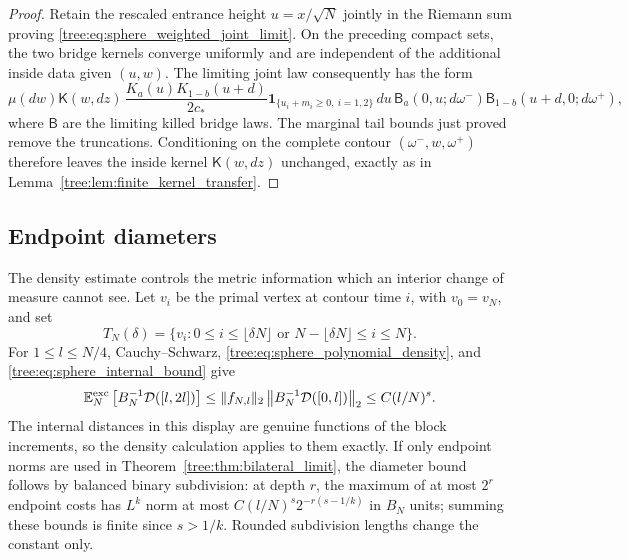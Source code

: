 \begin{proof}
Retain the rescaled entrance height $u=x/\sqrt N$ jointly in the Riemann
sum proving \eqref{tree:eq:sphere_weighted_joint_limit}.  On the preceding
compact sets, the two bridge kernels converge uniformly and are
independent of the additional inside data given $(u,w)$.  The limiting
joint law consequently has the form
\[
 \mu(dw)\mathsf K(w,dz)\,
 \frac{K_a(u)K_{1-b}(u+d)}{2c_*}
 \mathbf1_{\{u_i+m_i\geq0,\ i=1,2\}}\,du\,
 \mathsf B_a(0,u;d\omega^-)\mathsf B_{1-b}(u+d,0;d\omega^+),
\]
where $\mathsf B$ are the limiting killed bridge laws.  The marginal
tail bounds just proved remove the truncations.  Conditioning on the
complete contour $(\omega^-,w,\omega^+)$ therefore leaves the inside
kernel $\mathsf K(w,dz)$ unchanged, exactly as in
Lemma~\ref{tree:lem:finite_kernel_transfer}.

\end{proof}

\subsection{Endpoint diameters}

The density estimate controls the metric information which an interior
change of measure cannot see.  Let $v_i$ be the primal vertex at contour
time $i$, with $v_0=v_N$, and set
\[
 T_N(\delta)=\{v_i:0\leq i\leq\lfloor\delta N\rfloor
                   \text{ or }N-\lfloor\delta N\rfloor\leq i\leq N\}.
\]
For $1\leq l\leq N/4$, Cauchy--Schwarz,
\eqref{tree:eq:sphere_polynomial_density}, and
\eqref{tree:eq:sphere_internal_bound} give
\begin{equation}\label{tree:eq:sphere_endpoint_block}
 \mathbb E_N^{\mathrm{exc}}\left[B_N^{-1}\mathcal D([l,2l])\right]
 \leq \|f_{N,l}\|_2
         \left\|B_N^{-1}\mathcal D([0,l])\right\|_2
 \leq C(l/N)^s.
\end{equation}
The internal distances in this display are genuine functions of the block
increments, so the density calculation applies to them exactly.
If only endpoint norms are used in
Theorem~\ref{tree:thm:bilateral_limit}, the diameter bound follows by balanced
binary subdivision: at depth $r$, the maximum of at most $2^r$ endpoint
costs has $L^k$ norm at most
$C(l/N)^s2^{-r(s-1/k)}$ in $B_N$ units; summing these bounds is finite
since $s>1/k$.  Rounded subdivision lengths change the constant only.

